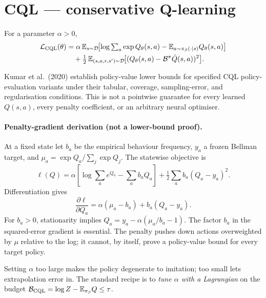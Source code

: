\documentclass[11pt,oneside]{scrbook}
\begin{document}
\section{CQL --- conservative Q-learning}

\begin{definition}
For a parameter $\alpha > 0$,
\begin{align*}
  \mathcal{L}_{\mathrm{CQL}}(\theta) &= \alpha \, \mathbb{E}_{s \sim \mathcal{D}}\!\bigl[\log \textstyle\sum_a \exp Q_\theta(s,a) - \mathbb{E}_{a \sim \pi_\beta(\cdot|s)} Q_\theta(s,a)\bigr] \\
  &\quad + \tfrac{1}{2}\, \mathbb{E}_{(s,a,r,s') \sim \mathcal{D}}\!\bigl[(Q_\theta(s,a) - \mathcal{B}^\pi \hat{Q}(s,a))^2\bigr].
\end{align*}
\end{definition}

\begin{remark}
Kumar et al.\ (2020) establish policy-value lower bounds for specified CQL
policy-evaluation variants under their tabular, coverage, sampling-error, and
regularisation conditions. This is not a pointwise guarantee for every learned
$Q(s,a)$, every penalty coefficient, or an arbitrary neural optimiser.
\end{remark}

\paragraph{Penalty-gradient derivation (not a lower-bound proof).}
At a fixed state let $b_a$ be the empirical behaviour frequency, $y_a$ a
frozen Bellman target, and $\mu_a=\exp Q_a/\sum_j\exp Q_j$. The statewise objective is
\[
 \ell(Q)=\alpha[\log\sum_a e^{Q_a}-\sum_a b_a Q_a]
       +\tfrac12\sum_a b_a(Q_a-y_a)^2.
\]
Differentiation gives
\[
 \frac{\partial\ell}{\partial Q_a}=\alpha(\mu_a-b_a)+b_a(Q_a-y_a).
\]
For $b_a>0$, stationarity implies $Q_a=y_a-\alpha(\mu_a/b_a-1)$.
The factor $b_a$ in the squared-error gradient is essential. The penalty
pushes down actions overweighted by $\mu$ relative to the log; it cannot,
by itself, prove a policy-value bound for every target policy.

\begin{pitfall}
Setting $\alpha$ too large makes the policy degenerate to imitation; too small lets
extrapolation error in. The standard recipe is to \emph{tune $\alpha$ with a
Lagrangian} on the budget $\mathcal{B}_\mathrm{CQL} = \log Z - \mathbb{E}_{\pi_\beta} Q \leq \tau$.
\end{pitfall}
\end{document}
